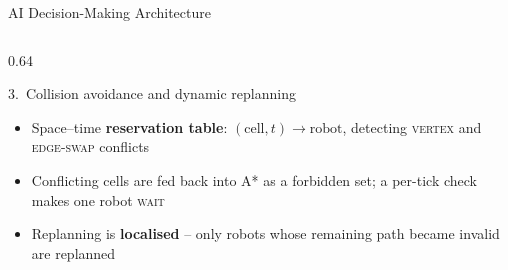 \documentclass[aspectratio=169,10pt,xcolor=table]{beamer}
\begin{document}
\begin{frame}{AI Decision-Making Architecture}
\begin{columns}[T,onlytextwidth]
\begin{column}{0.64\textwidth}
\vspace{-3pt}
\begin{block}{\small 3.\ Collision avoidance and dynamic replanning}
\vspace{-4pt}
\begin{itemize}
  \item Space--time \textbf{reservation table}: $(\mathrm{cell},t)\to\mathrm{robot}$, detecting
        \textsc{vertex} and \textsc{edge-swap} conflicts
  \item Conflicting cells are fed back into A* as a forbidden set; a per-tick check makes one robot \textsc{wait}
  \item Replanning is \textbf{localised} -- only robots whose remaining path became invalid are replanned
\end{itemize}
\end{block}

\end{column}
\end{columns}
\end{frame}
\end{document}
